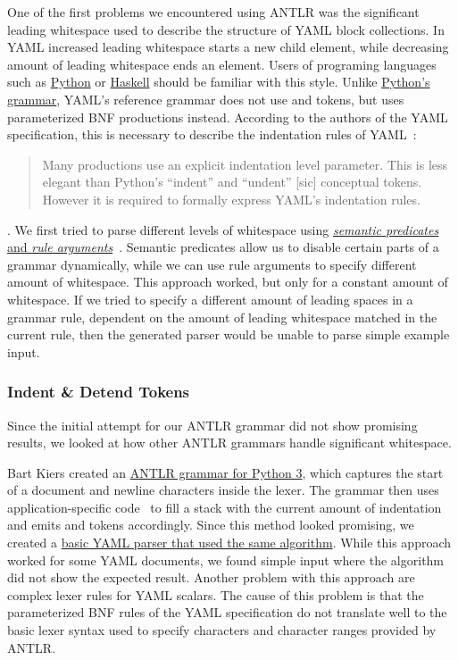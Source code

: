 One of the first problems we encountered using ANTLR was the significant leading whitespace used to describe the structure of YAML block \glspl{collection}. In YAML increased leading whitespace starts a new child element, while decreasing amount of leading whitespace ends an element. Users of programing languages such as \href{https://www.python.org}{Python} or \href{https://www.haskell.org}{Haskell} should be familiar with this style. Unlike \href{https://docs.python.org/3/reference/grammar.html}{Python’s grammar}, YAML’s reference grammar does not use  and  tokens, but uses parameterized \gls{BNF} productions instead. According to the authors of the YAML specification, this is necessary to describe the indentation rules of YAML~\cite{benevansdot2009yaml}:

\begin{quote}
  Many productions use an explicit indentation level parameter. This is less elegant than Python’s “indent” and “undent” [sic] conceptual tokens. However it is required to formally express YAML’s indentation rules.
\end{quote}

. We first tried to parse different levels of whitespace using \href{https://github.com/sanssecours/Yan-LR/compare/0b0deae...7d9e64e}{\emph{semantic predicates} and \emph{rule arguments}}~\cite{parr1995antlr}. Semantic predicates allow us to disable certain parts of a grammar dynamically, while we can use rule arguments to specify different amount of whitespace. This approach worked, but only for a constant amount of whitespace. If we tried to specify a different amount of leading spaces in a grammar rule, dependent on the amount of leading whitespace matched in the current rule, then the generated parser would be unable to parse simple example input.

\subsubsection{Indent \& Detend Tokens}

Since the initial attempt for our ANTLR grammar did not show promising results, we looked at how other ANTLR grammars handle significant whitespace.

Bart Kiers created an \href{https://github.com/antlr/grammars-v4/blob/master/python3/Python3.g4}{ANTLR grammar for Python 3}, which captures the start of a document and newline characters inside the lexer. The grammar then uses application-specific code~\cite[p. 48]{parr2013definitive} to fill a stack with the current amount of indentation and emits  and  tokens accordingly. Since this method looked promising, we created a \href{https://github.com/sanssecours/Yan-LR/compare/363be1e...188e5d4}{basic YAML parser that used the same algorithm}. While this approach worked for some YAML documents, we found simple input where the algorithm did not show the expected result. Another problem with this approach are complex lexer rules for YAML scalars. The cause of this problem is that the parameterized BNF rules of the YAML specification do not translate well to the basic lexer syntax used to specify characters and character ranges provided by ANTLR.

